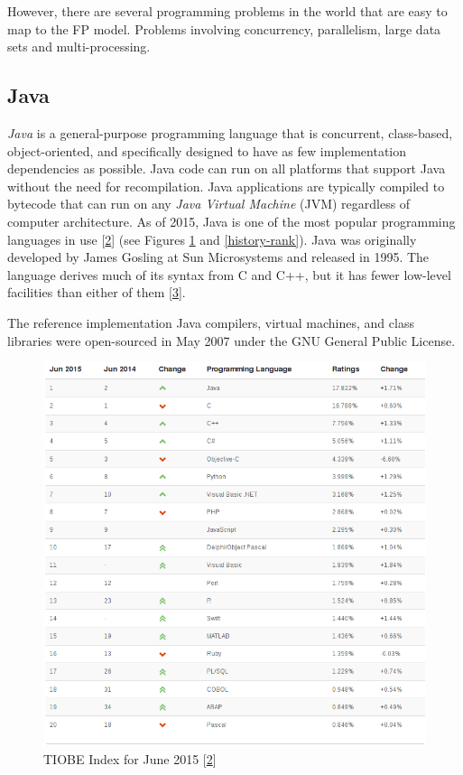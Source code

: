 \documentclass[12pt,a4paper,oneside,openright]{book}
\begin{document}
However, there are several programming problems in the world that are
easy to map to the FP model. Problems involving concurrency,
parallelism, large data sets and multi-processing.

\subsection{Java}\label{java}

\emph{Java} is a general-purpose programming language that is
concurrent, class-based, object-oriented, and specifically designed to
have as few implementation dependencies as possible. Java code can run
on all platforms that support Java without the need for recompilation.
Java applications are typically compiled to bytecode that can run on any
\emph{Java Virtual Machine} (JVM) regardless of computer architecture.
As of 2015, Java is one of the most popular programming languages in use
{[}\hyperref[ref-TIOBEIndex2015]{2}{]} (see Figures \ref{lang-rank} and
\ref{history-rank}). Java was originally developed by James Gosling at
Sun Microsystems and released in 1995. The language derives much of its
syntax from C and C++, but it has fewer low-level facilities than either
of them {[}\hyperref[ref-JavaWiki2015]{3}{]}.

The reference implementation Java compilers, virtual machines, and class
libraries were open-sourced in May 2007 under the GNU General Public
License.

\begin{figure}[htbp]
\centering
\includegraphics{figures/ranking.png}
\caption{TIOBE Index for June 2015
{[}\hyperref[ref-TIOBEIndex2015]{2}{]} \label{lang-rank}}
\end{figure}
\end{document}
